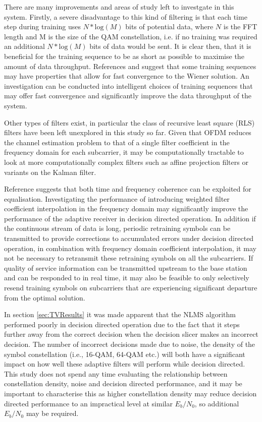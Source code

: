 There are many improvements and areas of study left to %
investgate in this system. Firstly, a severe disadvantage %
to this kind of filtering is that each time step during training %
uses $N*\text{log}\left( M \right)$ bits of potential data, where %
$N$ is the FFT length and M is the size of the QAM constellation, i.e. %
if no training was required an additional $N*\text{log}\left( M \right)$ %
bits of data would be sent. It is clear then, that %
it is beneficial for the training sequence to be as short %
as possible to maximise the amount of data throughput. %
References \cite{Qureshi77} and \cite{Crozier91} suggest %
that some training sequences may have properties that %
allow for fast convergence to the Wiener solution. %
An investigation can be conducted into intelligent %
choices of training sequences that may offer %
fast convergence and significantly improve the %
data throughput of the system.

Other types of filters exist, in particular the class %
of recursive least square (RLS) filters have been %
left unexplored in this study so far. Given that %
OFDM reduces the channel estimation problem %
to that of a single filter coefficient in the frequency %
domain for each subcarrier, it may be computationally %
tractable to look at more computationally complex filters %
such as affine projection filters or variants on the Kalman %
filter.

Reference \cite{Wei17} suggests that both time and frequency %
coherence can be exploited for equalisation. Investigating %
the performance of introducing weighted filter coefficient %
interpolation in the frequency domain may significantly %
improve the performance of the adaptive receiver in decision %
directed operation. In addition if the continuous stream of data %
is long, periodic retraining symbols can be transmitted to %
provide corrections to accumulated errors under decision %
directed operation, in combination with frequency domain %
coefficient interpolation, it may not be necessary to %
retransmit these retraining symbols on all the subcarriers. If %
quality of service information can be transmitted upstream %
to the base station and can be responded to in real time, it %
may also be feasible to only selectively resend training %
symbols on subcarriers that are experiencing significant %
departure from the optimal solution. 

In section \ref{sec:TVResults} it was made apparent that the %
NLMS algorithm performed poorly in decision directed operation %
due to the fact that it steps further away from the correct %
decision when the decision slicer makes an incorrect decision. %
The number of incorrect decisions made due to noise, the density %
of the symbol constellation (i.e., 16-QAM, 64-QAM etc.) will both %
have a significant impact on how well these adaptive filters will %
perform while decision directed. This study does not spend any %
time evaluating the relationship between constellation density, %
noise and decision directed performance, and it may be %
important to characterise this as higher constellation density %
may reduce decision directed performance to an impractical %
level at similar $E_b/N_0$, so additional $E_b/N_0$ may be %
required.

